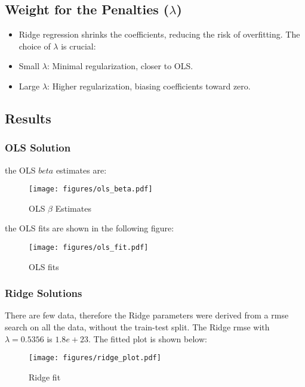 \subsection*{Weight for the Penalties ($\lambda$)}
\begin{itemize}
    \item Ridge regression shrinks the coefficients, reducing the risk of overfitting. The choice of $\lambda$ is crucial: 
    \item Small $\lambda$: Minimal regularization, closer to OLS.
    \item Large $\lambda$: Higher regularization, biasing coefficients toward zero.
\end{itemize}

\subsection*{Results}

\subsubsection*{OLS Solution}

the OLS $beta$ estimates  are:

\begin{figure}
    \centering
    \texttt{[image: figures/ols\_beta.pdf]}
    \caption{OLS $\beta$ Estimates}
\end{figure}

the OLS fits are shown in the following figure:

\begin{figure}
    \centering
    \texttt{[image: figures/ols\_fit.pdf]}
    \caption{OLS fits}
\end{figure}

\subsubsection*{Ridge Solutions}

There are few data, therefore the Ridge parameters were derived from a rmse search on all the data, without the train-test split.
The Ridge rmse with $\lambda = 0.5356$ is $1.8e+23$.
The fitted plot is shown below:
\begin{figure}
    \centering
    \texttt{[image: figures/ridge\_plot.pdf]}
    \caption{Ridge fit}
\end{figure}



